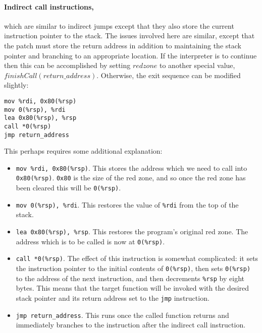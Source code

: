
\paragraph{Indirect call instructions,} which are similar to indirect jumps
except that they also store the current instruction pointer to the
stack.  The issues involved here are similar, except that the patch
must store the return address in addition to maintaining the stack
pointer and branching to an appropriate location.  If the interpreter
is to continue then this can be accomplished by setting $redzone$ to
another special value, $finishCall(return\_address)$.  Otherwise,
the exit sequence can be modified slightly:

\begin{verbatim}
mov %rdi, 0x80(%rsp)
mov 0(%rsp), %rdi
lea 0x80(%rsp), %rsp
call *0(%rsp)
jmp return_address
\end{verbatim}


This perhaps requires some additional explanation:

\begin{itemize}
\item \verb|mov %rdi, 0x80(%rsp)|.  This stores the address which we
  need to call into \verb|0x80(%rsp)|.  \verb|0x80| is the size of the
  red zone, and so once the red zone has been cleared this will be
  \verb|0(%rsp)|.
\item \verb|mov 0(%rsp), %rdi|.  This restores the value of
  \verb|%rdi| from the top of the stack.
\item \verb|lea 0x80(%rsp), %rsp|.  This restores the program's
  original red zone.  The address which is to be called is now at
  \verb|0(%rsp)|.
\item \verb|call *0(%rsp)|.  The effect of this instruction is
  somewhat complicated: it sets the instruction pointer to the initial
  contents of \verb|0(%rsp)|, then sets \verb|0(%rsp)| to the address
  of the next instruction, and then decrements \verb|%rsp| by eight
  bytes.  This means that the target function will be invoked with the
  desired stack pointer and its return address set to the \verb|jmp|
  instruction.
\item \verb|jmp return_address|.  This runs once the called function
  returns and immediately branches to the instruction after the
  indirect call instruction.
\end{itemize}

